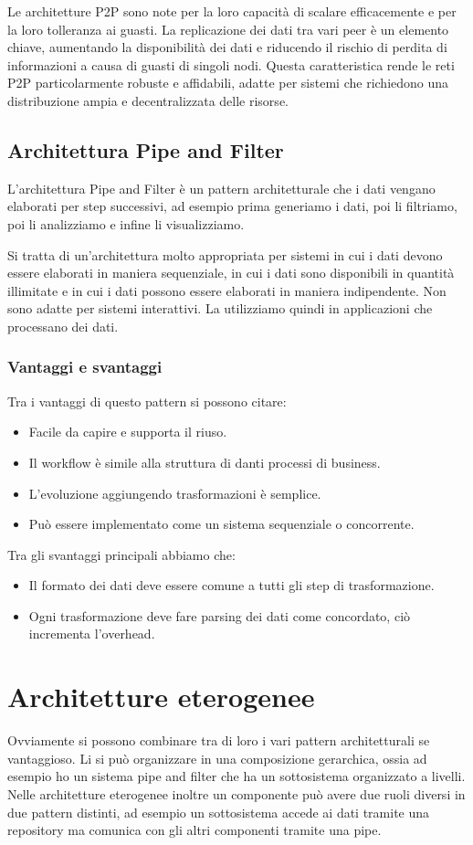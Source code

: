 Le architetture P2P sono note per la loro capacità di scalare efficacemente e
per la loro tolleranza ai guasti. La replicazione dei dati tra vari peer è un
elemento chiave, aumentando la disponibilità dei dati e riducendo il rischio di
perdita di informazioni a causa di guasti di singoli nodi. Questa caratteristica
rende le reti P2P particolarmente robuste e affidabili, adatte per sistemi che
richiedono una distribuzione ampia e decentralizzata delle risorse.
\subsection{Architettura Pipe and Filter}
L'architettura Pipe and Filter è un pattern architetturale che i dati 
vengano elaborati per step successivi, ad esempio prima generiamo i dati, poi li
filtriamo, poi li analizziamo e infine li visualizziamo. 

Si tratta di un'architettura molto appropriata per sistemi in cui i dati devono
essere elaborati in maniera sequenziale, in cui i dati sono disponibili in
quantità illimitate e in cui i dati possono essere elaborati in maniera
indipendente. Non sono adatte per sistemi interattivi.
La utilizziamo quindi in applicazioni che processano dei dati.

\subsubsection{Vantaggi e svantaggi}
Tra i vantaggi di questo pattern si possono citare:
\begin{itemize}
    \item Facile da capire e supporta il riuso.
    \item Il workflow è simile alla struttura di danti processi di business.
    \item L'evoluzione aggiungendo trasformazioni è semplice.
    \item Può essere implementato come un sistema sequenziale o concorrente.
\end{itemize}

Tra gli svantaggi principali abbiamo che:
\begin{itemize}
    \item Il formato dei dati deve essere comune a tutti gli step di trasformazione.
    \item Ogni trasformazione deve fare parsing dei dati come concordato, ciò incrementa 
    l'overhead.
\end{itemize}
\section{Architetture eterogenee}
Ovviamente si possono combinare tra di loro i vari pattern architetturali se vantaggioso.
Li si può organizzare in una composizione gerarchica, ossia ad esempio ho un sistema pipe
and filter che ha un sottosistema organizzato a livelli.
Nelle architetture eterogenee inoltre un componente può avere due ruoli diversi
in due pattern distinti, ad esempio un sottosistema accede ai dati tramite
una repository ma comunica con gli altri componenti tramite una pipe.